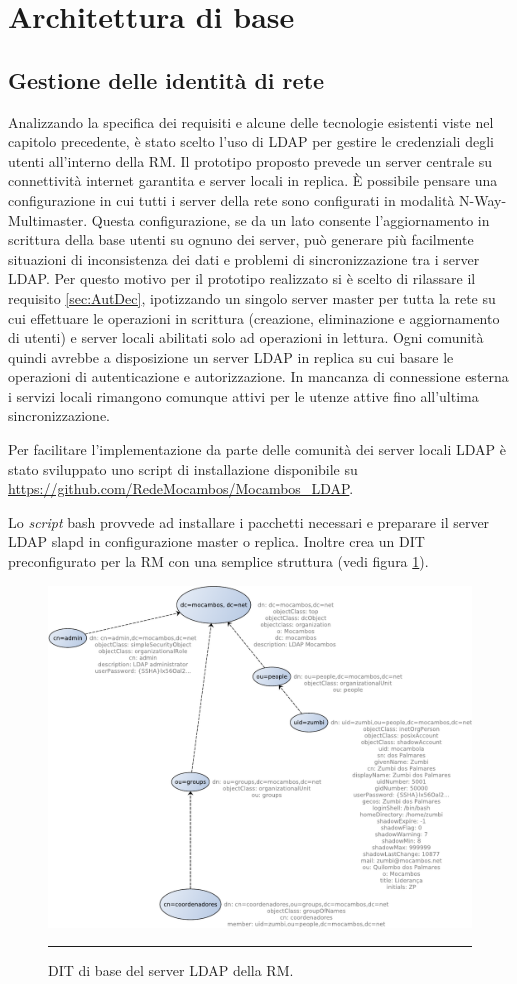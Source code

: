 \section{Architettura di base}

\subsection{Gestione delle identità di rete}
Analizzando la specifica dei requisiti e alcune delle tecnologie
esistenti viste nel capitolo precedente, è stato scelto l'uso di LDAP
per gestire le credenziali degli utenti all'interno della RM. Il
prototipo proposto prevede un server centrale su connettività internet
garantita e server locali in replica. È possibile pensare una
configurazione in cui tutti i server della rete sono configurati in
modalità N-Way-Multimaster. Questa configurazione, se da un lato
consente l'aggiornamento in scrittura della base utenti su ognuno dei
server, può generare più facilmente situazioni di inconsistenza dei
dati e problemi di sincronizzazione tra i server LDAP. Per questo
motivo per il prototipo realizzato si è scelto di rilassare il
requisito \ref{sec:AutDec}, ipotizzando un singolo server master per
tutta la rete su cui effettuare le operazioni in scrittura (creazione,
eliminazione e aggiornamento di utenti) e server locali abilitati solo
ad operazioni in lettura. Ogni comunità quindi avrebbe a disposizione
un server LDAP in replica su cui basare le operazioni di
autenticazione e autorizzazione. In mancanza di connessione esterna i
servizi locali rimangono comunque attivi per le utenze attive fino
all'ultima sincronizzazione.

Per facilitare l'implementazione da parte delle comunità dei server
locali LDAP è stato sviluppato uno script di installazione disponibile
su \url{https://github.com/RedeMocambos/Mocambos_LDAP}.

Lo \textit{script} bash provvede ad installare i pacchetti necessari e
preparare il server LDAP slapd in configurazione master o
replica. Inoltre crea un DIT preconfigurato per la RM con una semplice
struttura (vedi figura \ref{fig:DIT_ReteMocambos}).

\begin{figure}[htbp]
  \centering
  \includegraphics[width=\textwidth]{./Figure/DIT_ReteMocambos-crop.pdf}
  \rule{35em}{0.5pt}
  \caption[DIT di base del server LDAP della RM]{DIT di base del
    server LDAP della RM.}
  \label{fig:DIT_ReteMocambos}
\end{figure}




